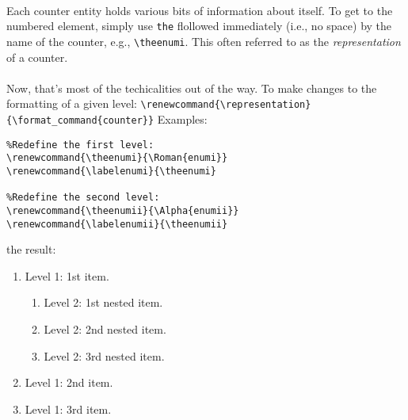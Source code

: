 {\paragraph{}
Each counter entity holds various bits of information about itself. To get
to the numbered element, simply use \verb|the| flollowed immediately
(i.e., no space) by the name of the counter, e.g., \verb|\theenumi|.
This often referred to as the \emph{representation} of a counter.
\paragraph{}
Now, that's most of the techicalities out of the way. To make changes to
the formatting of a given level:\newline
\verb|\renewcommand{\representation}{\format_command{counter}}|\newline
Examples:
\begin{verbatim}
%Redefine the first level:
\renewcommand{\theenumi}{\Roman{enumi}}
\renewcommand{\labelenumi}{\theenumi}

%Redefine the second level:
\renewcommand{\theenumii}{\Alpha{enumii}}
\renewcommand{\labelenumii}{\theenumii}
\end{verbatim}

\renewcommand{\theenumi}{\roman{enumi}}
\renewcommand{\labelenumi}{\theenumi}

\renewcommand{\theenumii}{\alph{enumii}}
\renewcommand{\labelenumii}{\theenumii}
the result:
\begin{enumerate}
	\item Level 1: 1st item.
\begin{enumerate}
	\item Level 2: 1st nested item.
	\item Level 2: 2nd nested item.
	\item Level 2: 3rd nested item.
\end{enumerate}
	\item Level 1: 2nd item.
	\item Level 1: 3rd item.
\end{enumerate}

}
